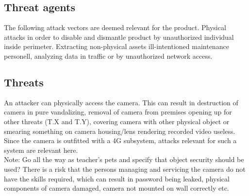 \documentclass[10pt]{article}
\begin{document}
    \subsection{Threat agents}

      The following attack vectors are deemed relevant for the product.
      Physical attacks in order to disable and dismantle product by
      unauthorized individual inside perimeter. Extracting non-physical
      assets ill-intentioned maintenance personell, analyzing data in
      traffic or by unauthorized network access.

    \subsection{Threats}
      \begin{itemize}[label={}]
         {
          An attacker can physically access the camera. This can result in
          destruction of camera in pure vandalizing, removal of camera from
          premises opening up for other threats (T.X and T.Y), covering camera
          with other physical object or smearing something on camera
          housing/lens rendering recorded video useless.
        }
         {
          Since the camera is outfitted with a 4G subsystem, attacks relevant for
          such a system are relevant here.
          \\ Note: Go all the way as teacher's pets and specify that object
          security should be used?
        }
         {
          There is a risk that the persons managing and servicing the camera do
          not have the skills required, which can result in password being
          leaked, physical components of camera damaged, camera not mounted on
          wall correctly etc.
        }

\end{itemize}
\end{document}

